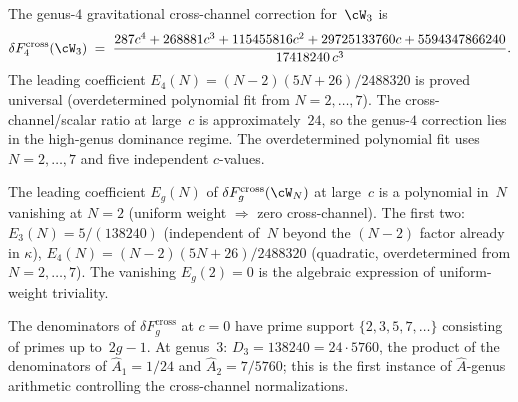 \begin{proposition}
\label{prop:w3-genus4-cross-channel}
The genus-$4$ gravitational cross-channel correction for~$\cW_3$ is
\begin{equation}\label{eq:w3-genus4-cross-channel}
\delta F_4^{\mathrm{cross}}(\cW_3)
\;=\;
\frac{287c^4 + 268881 c^3 + 115455816 c^2
 + 29725133760 c + 5594347866240}{17418240\, c^3}.
\end{equation}
The leading coefficient $E_4(N) = (N-2)(5N+26)/2488320$ is proved
universal (overdetermined polynomial fit from $N = 2, \ldots, 7$).
The cross-channel/scalar ratio at large~$c$ is approximately~$24$,
so the genus-$4$ correction lies in the high-genus dominance regime.
The overdetermined polynomial fit uses $N = 2, \ldots, 7$ and
five independent $c$-values.
\end{proposition}

\begin{remark}

\label{rem:universal-N-cross-channel}
The leading coefficient $E_g(N)$ of $\delta F_g^{\mathrm{cross}}(\cW_N)$
at large~$c$ is a polynomial in~$N$ vanishing at $N = 2$
(uniform weight $\Rightarrow$ zero cross-channel).
The first two:
$E_3(N) = 5/(138240)$ (independent of~$N$ beyond the
$(N{-}2)$ factor already in $\kappa$),
$E_4(N) = (N{-}2)(5N{+}26)/2488320$
(quadratic, overdetermined from $N = 2, \ldots, 7$).
The vanishing $E_g(2) = 0$ is the algebraic expression of
uniform-weight triviality.
\end{remark}

\begin{remark}

\label{rem:cross-channel-denominator}
The denominators of $\delta F_g^{\mathrm{cross}}$ at $c = 0$
have prime support $\{2, 3, 5, 7, \ldots\}$ consisting of
primes up to~$2g{-}1$. At genus~$3$:
$D_3 = 138240 = 24 \cdot 5760$, the product of the denominators
of $\hat{A}_1 = 1/24$ and $\hat{A}_2 = 7/5760$; this is the
first instance of $\hat{A}$-genus arithmetic controlling
the cross-channel normalizations.
\end{remark}


